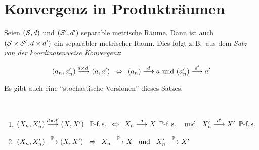 
\section{Konvergenz in Produkträumen}

Seien $(\S,d)$ und $(\S',d')$ separable metrische Räume. Dann ist auch $(\S \times \S',d \times  d')$ ein separabler metrischer Raum.
Dies folgt z.\,B.\ aus dem \textit{Satz von der koordinatenweise Konvergenz}:

\begin{equation}
	\label{eq: 3.1KoordinatenweissKonvergenz}
	\brackets{a_n, a_n'} \overset{d \times d'}{\longrightarrow} (a, a')
	\equivalent
	(a_n) \overset{d}{\longrightarrow} a
	\und
	(a_n') \overset{d'}{\longrightarrow} a'
\end{equation}

Es gibt auch eine \enquote{stochastische Versionen} dieses Satzes.

\begin{satz}
	\label{satz: 3.15} ~
	\begin{enumerate}[label=(\arabic*)]
		\item \label{it: 3.15koordKonvfs} 
			$(X_n,X_n')
			\overset{d \times d'}{\longrightarrow}
			(X,X') \enskip ~\P\text{-f.\,s.}
			\equivalent
			X_n \overset{d}{\longrightarrow} X \enskip \P\text{-f.\,s.\ } 
			\enskip \und \enskip
			X_n' \overset{d'}{\longrightarrow} X' \enskip \P\text{-f.\,s.}$
		\item \label{it: 3.15koordKonvprob} $(X_n,X_n') \probto (X,X')
			\equivalent
			X_n \probto X \enskip \und \enskip X_n' \probto X'$
	\end{enumerate}
\end{satz}

